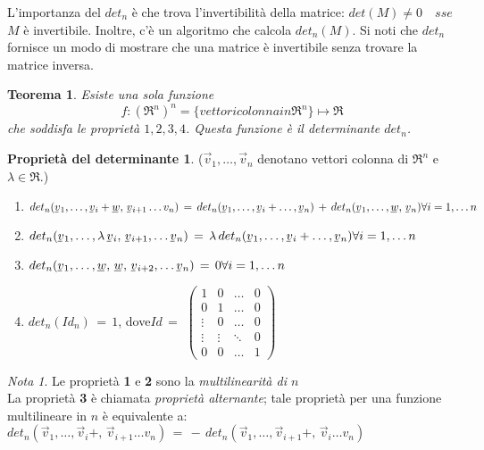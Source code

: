 \documentclass[a4paper]{report}
\newtheorem{teoremaDet}{Teorema}[section]
\theoremstyle{remark}
\newtheorem{nota1}{Nota}
\theoremstyle{definition}
\newtheorem{detProp}{Proprietà del determinante}
\newcommand{\uvec}[2][3]{\underline{#2\mkern-#1mu}\mkern#1mu}
\begin{document}
\bigskip
L'importanza del $det_n$ è che trova l'invertibilità della matrice:
$det(M) \ne 0\quad sse$ $M$ è invertibile. Inoltre, c'è un algoritmo che calcola $det_n(M)$. Si noti che $det_n$ fornisce un modo di mostrare che una matrice è invertibile senza trovare la matrice inversa.
\begin{teoremaDet}
	Esiste una sola funzione
	\[
	f: (\Re^{n})^{n} = \{vettori colonna in \Re ^{n}\} \longmapsto \Re
	\]
	che soddisfa le proprietà $1,2,3,4$. Questa funzione è il determinante $det_n$.
\end{teoremaDet}
%
\begin{detProp}
($\vec{v}_1,\dots,\vec{v}_n$ denotano vettori colonna di $\Re^{n}$ e $\lambda \in \Re$.)

\begin{enumerate}
	\item $det_n(\uvec{v}_1,\dots,\uvec{v}_i+\uvec{w},\,\uvec{v}_{i+1}\dots{v}_n)\,=\, 			det_n(\uvec{v}_1,\dots,\uvec{v}_i+\dots,\uvec{v}_n)\,+ \, det_n(\uvec{v}_1,\dots,\uvec{w},\,\uvec{v}_n)\\
	\forall i=1,\dots n$
	\item $det_n(\uvec{v}_1,\dots,\lambda\,\uvec{v}_i,\,\uvec{v}_{i+1},\dots\uvec{v}_n)\,=\, \lambda\,det_n(\uvec{v}_1,\dots,\uvec{v}_i+\dots,\uvec{v}_n)\\
	\forall i=1,\dots n$
	\item $det_n(\uvec{v}_1,\dots,\uvec{w},\,\uvec{w},\,\uvec{v}_{i+2},\dots\uvec{v}_n)\,=\,0\\
	\forall i=1,\dots n$
	\item $det_n(Id_n)\,=\,1$,
	dove\quad $Id\,=$
	$
	\begin{pmatrix}
	1 & 0 & \dots & 0\\
	0 & 1 & \dots & 0\\
	\vdots & 0 & \dots & 0\\
	\vdots & \vdots & \ddots & 0\\
	0 & 0 & \dots & 1
	\end{pmatrix}
	$
\end{enumerate}
\end{detProp}
%
\begin{nota1}
	Le proprietà {\bfseries 1} e {\bfseries 2} sono la {\itshape multilinearità di $n$}\\
	La proprietà {\bfseries 3} è chiamata {\itshape proprietà alternante}; tale proprietà per una funzione multilineare in $n$ è equivalente a:\\
	$det_n(\vec{v}_1,\dots,\vec{v}_i+,\,\vec{v}_{i+1}\dots{v}_n)\,=\,-\,det_n(\vec{v}_1,\dots,\vec{v}_{i+1}+,\,\vec{v}_i\dots{v}_n)$
\end{nota1}
\end{document}
